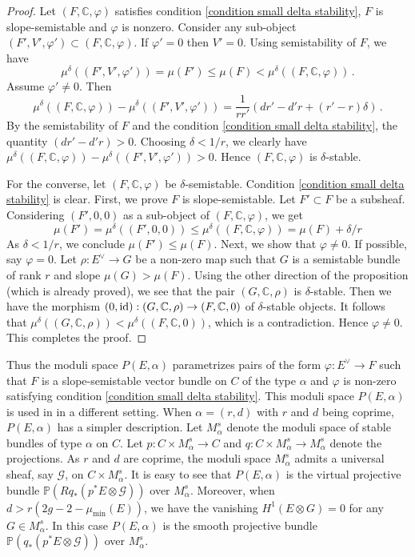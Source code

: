 \documentclass[11pt]{amsart}
\theoremstyle{remark}
\newcommand{\C}{\mathbb{C}}
\newcommand{\mb}[1]{\mathbb{#1}}
\newcommand{\G}{\mathcal{G}}
\newcommand{\id}{\textup{id}}
\newcommand{\vp}[0]{\varphi}
\numberwithin{theorem}{section}
\begin{document}
    \begin{proof}
        Let $(F,\C,\vp)$ satisfies condition \eqref{condition small delta stability}, $F$ is slope-semistable and $\vp$ is nonzero.
        Consider any sub-object $(F',V',\vp') \subset (F,\C,\vp)$.
        If $\vp' = 0$ then $V' = 0$. 
        Using semistability of $F$, we have
        $$\mu^\delta((F',V',\vp')) = \mu(F')\leqslant \mu(F) < \mu^\delta((F,\C,\vp)) \,.$$
        Assume $\vp'\neq 0$. Then
        $$\mu^\delta((F,\C,\vp)) -\mu^\delta((F',V',\vp')) = 
        \frac{1}{rr'} \left(dr'-d'r + (r'-r)\delta \right)\,.$$
        By the semistability of $F$ and the condition \eqref{condition small delta stability},
        the quantity $(dr'-d'r) > 0$.
        Choosing $\delta < 1/r$, we clearly have
        $\mu^\delta((F,\C,\vp)) -\mu^\delta((F',V',\vp')) > 0$.
        Hence $(F,\C,\vp)$ is $\delta$-stable.

        For the converse, let $(F,\C,\vp)$ be $\delta$-semistable.
        Condition \eqref{condition small delta stability} is clear.
        First, we prove $F$ is slope-semistable.
        Let $F' \subset F$ be a subsheaf.
        Considering $(F',0,0)$ as a sub-object of $(F,\C,\vp)$,
        we get
        $$\mu(F') = \mu^\delta((F',0,0)) \leqslant \mu^\delta((F,\C,\vp)) = \mu(F) + \delta/r$$
        As $\delta<1/r$, we conclude $\mu(F') \leqslant \mu(F)$.
        Next, we show that $\vp \neq 0$.
        If possible, say $\vp =0$.
        Let $\rho : E^\vee \to G$ be a non-zero map
        such that $G$ is a semistable bundle of rank $r$ and slope
        $\mu(G) > \mu(F)$.
        Using the other direction of the proposition (which is already proved), 
        we see that the pair $(G,\C,\rho)$ is $\delta$-stable.
        Then we have the morphism $(0,\id): (G,\C,\rho) \to (F,\C,0)$ of $\delta$-stable objects.
        It follows that $\mu^\delta((G,\C,\rho))<\mu^\delta((F,\C,0))$,
        which is a contradiction.
        Hence $\vp \neq 0$. This completes the proof.
    \end{proof}
    Thus the moduli space $P(E,\alpha)$ parametrizes pairs of the form $\vp: E^\vee \to F$
    such that $F$ is a slope-semistable vector bundle on $C$ of the type $\alpha$ and 
    $\vp$ is non-zero satisfying condition \eqref{condition small delta stability}.
    This moduli space $P(E,\alpha)$ is used in \cite{BDW} in a different setting.
    When $\alpha=(r,d)$ with $r$ and $d$ being coprime,
    $P(E,\alpha)$ has a simpler description.
    Let $M_\alpha^s$ denote the moduli space of stable bundles of type $\alpha$ on $C$.
    Let $p: C \times M^s_\alpha \to C$ and 
    $q: C \times M^s_\alpha \to M^s_\alpha$ denote the projections.
    As $r$ and $d$ are coprime, the moduli space $M_\alpha^s$ 
    admits a universal sheaf, say $\G$, on $C \times M^s_\alpha$.
    It is easy to see that $P(E,\alpha)$ 
    is the virtual projective bundle $\mb P(Rq_*(p^*E \otimes \G))$ over $M^s_\alpha$.
    Moreover, when $d > r(2g-2-\mu_{\min}(E))$,
    we have the vanishing
    $H^1(E \otimes G)=0$ for any $G \in M^s_{\alpha}$.
    In this case $P(E,\alpha)$ is the smooth projective bundle
    $\mb P(q_*(p^*E\otimes \G))$ over $M^s_\alpha$.
\end{document}
